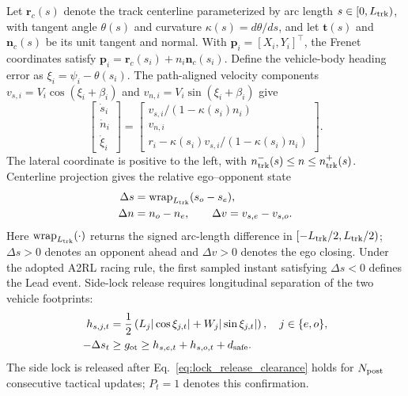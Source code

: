\documentclass[journal,twoside,web]{ieeecolor}
\begin{document}
Let $\bm r_c(s)$ denote the track centerline parameterized by arc length
$s\in[0,L_{\rm trk})$, with tangent angle $\theta(s)$ and curvature
$\kappa(s)=d\theta/ds$, and let $\bm t(s)$ and $\bm n_c(s)$ be its unit tangent
and normal. With $\bm p_i=[X_i,Y_i]^\top$, the Frenet coordinates satisfy
$\bm p_i=\bm r_c(s_i)+n_i\bm n_c(s_i)$. Define the vehicle-body heading
error as $\xi_i=\psi_i-\theta(s_i)$. The path-aligned velocity components
$v_{s,i}=V_i\cos(\xi_i+\beta_i)$ and
$v_{n,i}=V_i\sin(\xi_i+\beta_i)$ give
\begin{equation}
\begin{bmatrix}\dot s_i\\\dot n_i\\\dot\xi_i\end{bmatrix}
=
\begin{bmatrix}
v_{s,i}/(1-\kappa(s_i)n_i)\\
v_{n,i}\\
r_i-\kappa(s_i)v_{s,i}/(1-\kappa(s_i)n_i)
\end{bmatrix}.
\label{eq:frenet_kinematics}
\end{equation}
The lateral coordinate is positive to the left, with
$n_{\rm trk}^{-}(s)\le n\le n_{\rm trk}^{+}(s)$.
Centerline projection gives the relative ego--opponent state
\begin{equation}
\begin{aligned}
\Delta s&=\operatorname{wrap}_{L_{\rm trk}}(s_o-s_e),\\
\Delta n&=n_o-n_e,\qquad \Delta v=v_{s,e}-v_{s,o}.
\end{aligned}
\label{eq:rel}
\end{equation}
Here $\operatorname{wrap}_{L_{\rm trk}}(\cdot)$ returns the signed
arc-length difference in $[-L_{\rm trk}/2,L_{\rm trk}/2)$;
$\Delta s>0$ denotes an opponent ahead and $\Delta v>0$ denotes
the ego closing. Under the adopted A2RL racing rule, the first sampled
instant satisfying $\Delta s<0$ defines the Lead event. Side-lock release
requires longitudinal separation of the two vehicle footprints:
\begin{equation}
\begin{aligned}
h_{s,j,t}&=\frac12\left(L_j|\cos\xi_{j,t}|+W_j|\sin\xi_{j,t}|\right),
\quad j\in\{e,o\},\\
-\Delta s_t&\ge g_{\rm ot}\ge
h_{s,e,t}+h_{s,o,t}+d_{\rm safe}.
\end{aligned}
\label{eq:lock_release_clearance}
\end{equation}
The side lock is released after Eq.~\eqref{eq:lock_release_clearance} holds
for $N_{\rm post}$ consecutive tactical updates; $P_t=1$ denotes this
confirmation.
\end{document}
